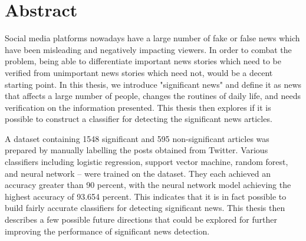 \chapter*{Abstract}
\makeabstract

Social media platforms nowadays have a large number of fake or false news which have been misleading and negatively impacting viewers. In order to combat the problem, being able to differentiate important news stories which need to be verified from unimportant news stories which need not, would be a decent starting point. In this thesis, we introduce "significant news" and define it as news that affects a large number of people, changes the routines of daily life, and needs verification on the information presented. This thesis then explores if it is possible to construct a classifier for detecting the significant news articles.

A dataset containing 1548 significant and 595 non-significant articles was prepared by manually labelling the posts obtained from Twitter. Various classifiers including logistic regression, support vector machine, random forest, and neural network -- were trained on the dataset. They each achieved an accuracy greater than 90 percent, with the neural network model achieving the highest accuracy of 93.654 percent. This indicates that it is in fact possible to build fairly accurate classifiers for detecting significant news. This thesis then describes a few possible future directions that could be explored for further improving the performance of significant news detection.


\abstractsig
